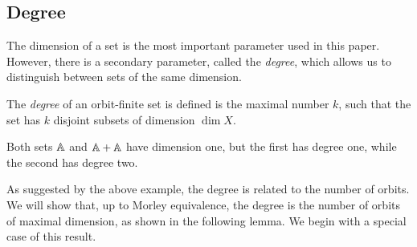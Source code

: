 \subsection{Degree}
\label{sec:degree}
 The dimension of a set is the most important parameter used in this paper. However, there is a secondary parameter, called the \emph{degree}, which allows us to distinguish between sets of the same dimension.

\begin{definition}[Degree]
	The \emph{degree} of an orbit-finite set is defined is the maximal number $k$, such that the set has $k$ disjoint subsets of dimension $\dim X$.
\end{definition}

\begin{myexample}
Both sets $\mathbb A$ and $\mathbb A + \mathbb A$ have dimension one, but the first has degree one, while the second has degree two.
\end{myexample}

As suggested by the above example, the degree is related to the number of orbits. We will show that,  up to Morley equivalence, the degree is the number of orbits of maximal dimension, as shown in the following lemma. We begin with a special case of this result.


